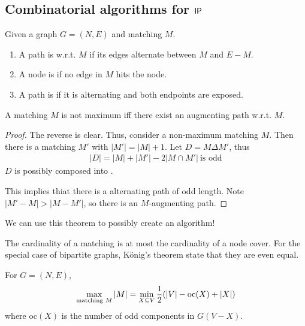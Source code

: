 
\subsection{Combinatorial algorithms for $\mathsf{IP}$}
\begin{definition}
    Given a graph $G=(N,E)$ and matching $M$.
    \begin{enumerate}
        \item A path is  w.r.t. $M$
              if its edges alternate between $M$ and $E-M$.
        \item A node is  if no edge in $M$ hits the node.
        \item A path is  if it is alternating and both endpoints are exposed.
    \end{enumerate}
\end{definition}
\begin{theorem}
    A matching $M$ is not maximum iff there exist an augmenting path w.r.t. $M$.
\end{theorem}
\begin{proof}
    The reverse is clear. Thus, consider a non-maximum matching $M$. Then there
    is a matching $M'$ with $|M'|=|M|+1$. Let $D=M \Delta M'$, thus
    \begin{align*}
        |D|=|M|+|M'|-2|M \cap M'| \ \text{is odd}
    \end{align*}
    $D$ is possibly composed into .

    This implies thiat there is a alternating path of odd length.
    Note $|M'-M|>|M-M'|$, so there is an $M$-augmenting path.
\end{proof}
We can use this theorem to possibly create an algorithm!
\begin{recall}
    The cardinality of a matching is at most the cardinality of a node cover.
    For the special case of bipartite graphs, König's theorem state that they are even equal.
\end{recall}
\begin{theorem}
    For $G=(N,E)$,
    \begin{align*}
        \max_{\text{matching } M}|M|= \min_{X \subseteq V} \frac{1}{2}(|V|-\text{oc}(X)+|X|)
    \end{align*}
    where oc$(X)$ is the number of  odd components in $G(V-X)$.
\end{theorem}
